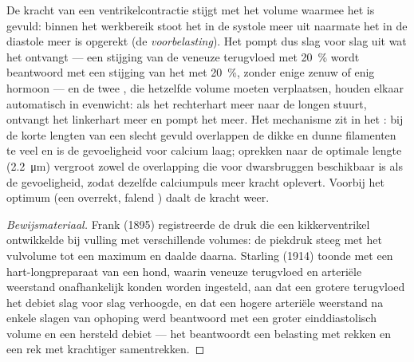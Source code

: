 \begin{theorem}\label{thm:b2:heart:starling}
De kracht van een ventrikelcontractie stijgt met het volume waarmee het is
gevuld: binnen het werkbereik stoot het  in de systole meer uit
naarmate het in de diastole meer is opgerekt (de \emph{voorbelasting}). Het
 pompt dus slag voor slag uit wat het ontvangt --- een stijging van de
veneuze terugvloed met \qty{20}{\%} wordt beantwoord met een stijging van
het  met \qty{20}{\%}, zonder enige zenuw of enig hormoon --- en
de twee , die hetzelfde volume moeten verplaatsen, houden elkaar
automatisch in evenwicht: als het rechterhart meer  naar de longen
stuurt, ontvangt het linkerhart meer en pompt het meer. Het mechanisme zit
in het : bij de korte lengten van een slecht gevuld 
overlappen de dikke en dunne filamenten te veel en is de gevoeligheid voor
calcium laag; oprekken naar de optimale lengte
(\qty{2.2}{\micro m}) vergroot zowel de overlapping die voor
dwarsbruggen beschikbaar is als de gevoeligheid, zodat dezelfde calciumpuls
meer kracht oplevert. Voorbij het optimum (een overrekt, falend ) daalt
de kracht weer.
\end{theorem}
\begin{proof}[Bewijsmateriaal]
Frank (1895) registreerde de druk die een kikkerventrikel ontwikkelde bij
vulling met verschillende volumes: de piekdruk steeg met het vulvolume tot
een maximum en daalde daarna. Starling (1914) toonde met een
hart-longpreparaat van een hond, waarin veneuze terugvloed en arteriële
weerstand onafhankelijk konden worden ingesteld, aan dat een grotere
terugvloed het debiet slag voor slag verhoogde, en dat een hogere arteriële
weerstand na enkele slagen van ophoping werd beantwoord met een groter
einddiastolisch volume en een hersteld debiet --- het  beantwoordt
een belasting met rekken en een rek met krachtiger samentrekken.
\end{proof}

